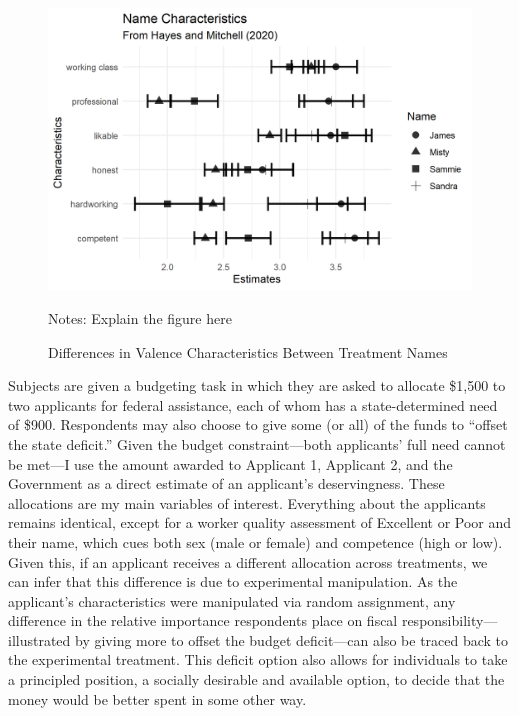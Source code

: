\documentclass[12pt]{article}%
\begin{document}
\begin{doublespace}
\begin{figure}[h!]
	\centering
	\includegraphics[scale=1]{figs/characteristics.png}
	{\singlespacing
		\parbox{0.78\textwidth}{\scriptsize%
			Notes: Explain the figure here
	}}
	\caption{Differences in Valence Characteristics Between Treatment Names}
	\label{characteristics}
\end{figure}


Subjects are given a budgeting task in which they are asked to allocate \$1,500 to two applicants for federal assistance, each of whom has a state-determined need of \$900. Respondents may also choose to give some (or all) of the funds to ``offset the state deficit.” Given the budget constraint—both applicants’ full need cannot be met—I use the amount awarded to Applicant 1, Applicant 2, and the Government as a direct estimate of an applicant’s deservingness. These allocations are my main variables of interest. Everything about the applicants remains identical, except for a worker quality assessment of Excellent or Poor and their name, which cues both sex (male or female) and competence (high or low). Given this, if an applicant receives a different allocation across treatments, we can infer that this difference is due to experimental manipulation. As the applicant’s characteristics were manipulated via random assignment, any difference in the relative importance respondents place on fiscal responsibility—illustrated by giving more to offset the budget deficit—can also be traced back to the experimental treatment. This deficit option also allows for individuals to take a principled position, a socially desirable and available option, to decide that the money would be better spent in some other way.


\end{doublespace}
\end{document}
